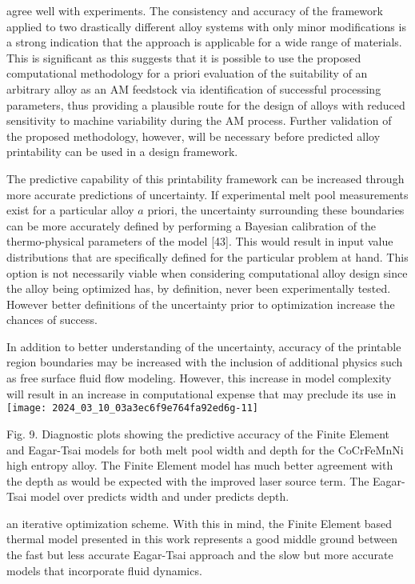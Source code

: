 \documentclass[10pt]{article}
\begin{document}
agree well with experiments. The consistency and accuracy of the framework applied to two drastically different alloy systems with only minor modifications is a strong indication that the approach is applicable for a wide range of materials. This is significant as this suggests that it is possible to use the proposed computational methodology for a priori evaluation of the suitability of an arbitrary alloy as an AM feedstock via identification of successful processing parameters, thus providing a plausible route for the design of alloys with reduced sensitivity to machine variability during the AM process. Further validation of the proposed methodology, however, will be necessary before predicted alloy printability can be used in a design framework.

The predictive capability of this printability framework can be increased through more accurate predictions of uncertainty. If experimental melt pool measurements exist for a particular alloy $a$ priori, the uncertainty surrounding these boundaries can be more accurately defined by performing a Bayesian calibration of the thermo-physical parameters of the model [43]. This would result in input value distributions that are specifically defined for the particular problem at hand. This option is not necessarily viable when considering computational alloy design since the alloy being optimized has, by definition, never been experimentally tested. However better definitions of the uncertainty prior to optimization increase the chances of success.

In addition to better understanding of the uncertainty, accuracy of the printable region boundaries may be increased with the inclusion of additional physics such as free surface fluid flow modeling. However, this increase in model complexity will result in an increase in computational expense that may preclude its use in\\
\texttt{[image: 2024\_03\_10\_03a3ec6f9e764fa92ed6g-11]}

Fig. 9. Diagnostic plots showing the predictive accuracy of the Finite Element and Eagar-Tsai models for both melt pool width and depth for the CoCrFeMnNi high entropy alloy. The Finite Element model has much better agreement with the depth as would be expected with the improved laser source term. The Eagar-Tsai model over predicts width and under predicts depth.

an iterative optimization scheme. With this in mind, the Finite Element based thermal model presented in this work represents a good middle ground between the fast but less accurate Eagar-Tsai approach and the slow but more accurate models that incorporate fluid dynamics.
\end{document}
